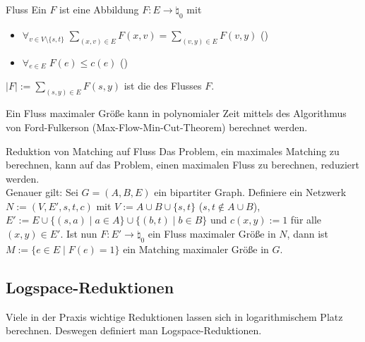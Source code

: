\begin{Def}{Fluss}
    Ein  $F$ ist eine Abbildung $F\colon E \rightarrow \natural_0$ mit
    \begin{itemize}
        \item
        $\forall_{v \in V \setminus \{s, t\}}\;
        \sum_{(x, v) \in E} F(x, v) = \sum_{(v, y) \in E} F(v, y)$ ()
        
        \item
        $\forall_{e \in E}\; F(e) \le c(e)$ ()
    \end{itemize}
    $|F| := \sum_{(s, y) \in E} F(s, y)$ ist die  des Flusses $F$.
\end{Def}

\begin{Bem}
    Ein Fluss maximaler Größe kann in polynomialer Zeit mittels des
    Algorithmus von Ford-Fulkerson (Max-Flow-Min-Cut-Theorem) berechnet werden.
\end{Bem}

\linie

\begin{Satz}{Reduktion von Matching auf Fluss}
    Das Problem, ein maximales Matching zu berechnen, kann auf das Problem, einen
    maximalen Fluss zu berechnen, reduziert werden.\\
    Genauer gilt:
    Sei $G = (A, B, E)$ ein bipartiter Graph.
    Definiere ein Netzwerk $N := (V, E', s, t, c)$ mit
    $V := A \cup B \cup \{s, t\}$ ($s, t \notin A \cup B$),
    $E' := E \cup \{(s, a) \;|\; a \in A\} \cup \{(b, t) \;|\; b \in B\}$ und
    $c(x, y) := 1$ für alle $(x, y) \in E'$.
    Ist nun $F\colon E' \rightarrow \natural_0$ ein Fluss maximaler Größe in $N$,
    dann ist $M := \{e \in E \;|\; F(e) = 1\}$ ein Matching maximaler Größe in $G$.
\end{Satz}

\pagebreak

\subsection{%
    Logspace-Reduktionen%
}

\begin{Bem}
    Viele in der Praxis wichtige Reduktionen lassen sich in logarithmischem Platz berechnen.
    Deswegen definiert man Logspace-Reduktionen.
\end{Bem}

